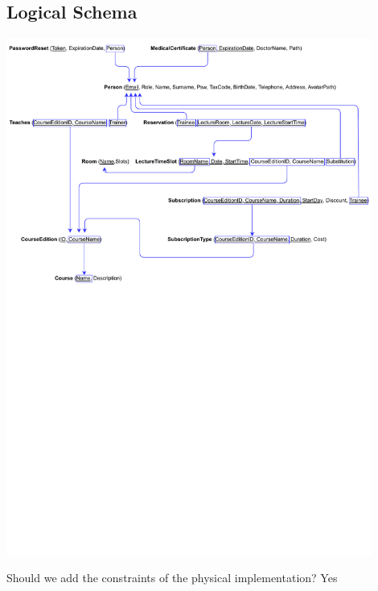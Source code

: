 \subsection{Logical Schema}
    \begin{center}
		\includegraphics[width=0.9\textwidth,bb = 0 440 700 850,clip=true]{resources/Logical_Schema.pdf}
    \end{center}

	Should we add the constraints of the physical implementation? Yes
    
	